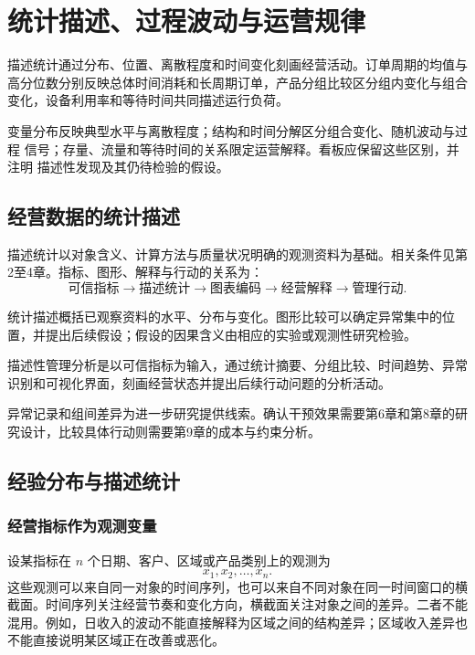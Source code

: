 \chapter{统计描述、过程波动与运营规律}
\label{ch:week05-statistics-dashboard}

描述统计通过分布、位置、离散程度和时间变化刻画经营活动。订单周期的均值与
高分位数分别反映总体时间消耗和长周期订单，产品分组比较区分组内变化与组合
变化，设备利用率和等待时间共同描述运行负荷。

变量分布反映典型水平与离散程度；结构和时间分解区分组合变化、随机波动与过程
信号；存量、流量和等待时间的关系限定运营解释。看板应保留这些区别，并注明
描述性发现及其仍待检验的假设。

\section{经营数据的统计描述}

描述统计以对象含义、计算方法与质量状况明确的观测资料为基础。相关条件见第2至4章。指标、图形、解释与行动的关系为：
\[
\text{可信指标}
\rightarrow
\text{描述统计}
\rightarrow
\text{图表编码}
\rightarrow
\text{经营解释}
\rightarrow
\text{管理行动}.
\]

统计描述概括已观察资料的水平、分布与变化。图形比较可以确定异常集中的位置，并提出后续假设；假设的因果含义由相应的实验或观测性研究检验。

\begin{definition}[描述性管理分析]
描述性管理分析是以可信指标为输入，通过统计摘要、分组比较、时间趋势、异常识别和可视化界面，刻画经营状态并提出后续行动问题的分析活动。
\end{definition}

异常记录和组间差异为进一步研究提供线索。确认干预效果需要第6章和第8章的研究设计，比较具体行动则需要第9章的成本与约束分析。

\section{经验分布与描述统计}
\subsection{经营指标作为观测变量}

设某指标在 \(n\) 个日期、客户、区域或产品类别上的观测为
\[
x_1,x_2,\ldots,x_n.
\]
这些观测可以来自同一对象的时间序列，也可以来自不同对象在同一时间窗口的横截面。时间序列关注经营节奏和变化方向，横截面关注对象之间的差异。二者不能混用。例如，日收入的波动不能直接解释为区域之间的结构差异；区域收入差异也不能直接说明某区域正在改善或恶化。

